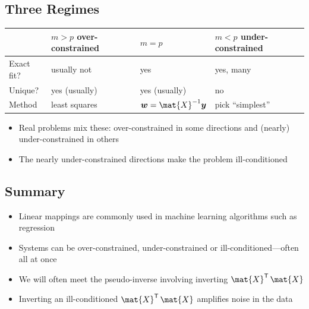 \begin{slide}
\section[-1]{Three Regimes}

\begin{PauseHighLight}

  \begin{center}
    \renewcommand{\arraystretch}{1.2}
    \begin{tabular}{|l|p{6.0cm}|p{4.9cm}|p{6.7cm}|}\hline
      & $m>p$ \newline \mbox{over-constrained} & $m=p$ & $m<p$ \newline
      \mbox{under-constrained} \\ \hline
      Exact fit? & usually not & yes & yes, many \\ \hline
      Unique? & yes (usually) & yes (usually) & no \\ \hline
      Method & least squares & $\bm{w}=\mat{X}^{-1}\bm{y}$ & pick ``simplest'' \\ \hline
    \end{tabular}\pause
  \end{center}
  \begin{itemize}
  \item Real problems mix these: over-constrained in some directions
    and (nearly) under-constrained in others\pause
  \item The nearly under-constrained directions make the problem
    ill-conditioned\pause
  \end{itemize}
\end{PauseHighLight}

\end{slide}


\begin{slide}
\section{Summary}

\begin{PauseHighLight}
  \begin{itemize}
  \item Linear mappings are commonly used in machine learning algorithms
    such as regression\pause
  \item Systems can be over-constrained, under-constrained or
    ill-conditioned---often all at once\pause
  \item We will often meet the pseudo-inverse involving inverting
    $\mat{X}^\tr\,\mat{X}$\pause 
  \item Inverting an ill-conditioned $\mat{X}^\tr\,\mat{X}$ amplifies noise in the data\pause
  \end{itemize}
\end{PauseHighLight}

\end{slide}




